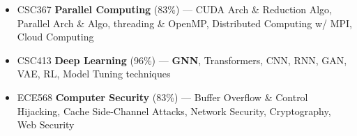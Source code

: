 \documentclass[10pt,a4paper,ragged2e,withhyper]{altacv}
\begin{document}
\begin{paracol}{2}
\begin{itemize}




    \end{itemize}

    \vspace{-3pt}

    \begin{itemize}

        \item  CSC367 \textbf{Parallel Computing} (83\%) ---
              CUDA Arch \& Reduction Algo, Parallel Arch \& Algo, threading \&
              OpenMP, Distributed Computing w/ MPI, Cloud Computing


        \item CSC413 \textbf{Deep Learning} (96\%) --- \textbf{GNN}, Transformers, CNN, RNN, GAN, VAE,  RL, Model Tuning techniques

        \item ECE568 \textbf{Computer Security} (83\%) --- Buffer Overflow \& Control Hijacking, Cache Side-Channel Attacks, Network Security, Cryptography, Web Security


\end{itemize}
\end{paracol}
\end{document}
